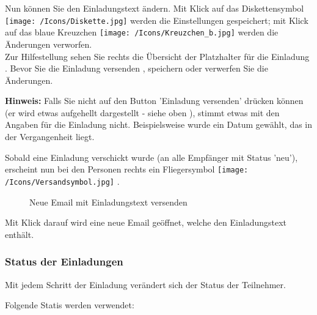 Nun können Sie den Einladungstext  ändern. Mit Klick auf das Diskettensymbol \texttt{[image: /Icons/Diskette.jpg]}  werden die Einstellungen gespeichert; mit Klick auf das blaue Kreuzchen \texttt{[image: /Icons/Kreuzchen\_b.jpg]}  werden die Änderungen verworfen.\\
Zur Hilfestellung sehen Sie rechts die Übersicht der Platzhalter für die Einladung . Bevor Sie die Einladung versenden , speichern  oder verwerfen  Sie die Änderungen.

\vspace{\baselineskip}

\textbf{Hinweis:} Falls Sie nicht auf den Button 'Einladung versenden' drücken können (er wird etwas aufgehellt dargestellt - siehe oben ), stimmt etwas mit den Angaben für die Einladung nicht. Beispielsweise wurde ein Datum gewählt, das in der Vergangenheit liegt.

\vspace{\baselineskip}

Sobald eine Einladung verschickt wurde (an alle Empfänger mit Status 'neu'), erscheint nun bei den Personen rechts ein Fliegersymbol \texttt{[image: /Icons/Versandsymbol.jpg]} .

\begin{figure}[H]
\caption{Neue Email mit Einladungstext versenden}
\end{figure}

Mit Klick darauf wird eine neue Email geöffnet, welche den Einladungstext enthält.

\subsubsection{Status der Einladungen}

Mit jedem Schritt der Einladung verändert sich der Status der Teilnehmer.

Folgende Statis werden verwendet:

